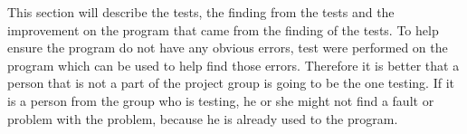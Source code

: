 This section will describe the tests, the finding from the tests and the improvement on the program that came from the finding of the tests. To help ensure the program do not have any obvious errors, test were performed on the program which can be used to help find those errors. Therefore it is better that a person that is not a part of the project group is going to be the one testing. If it is a person from the group who is testing, he or she might not find a fault or problem with the problem, because he is already used to the program. 